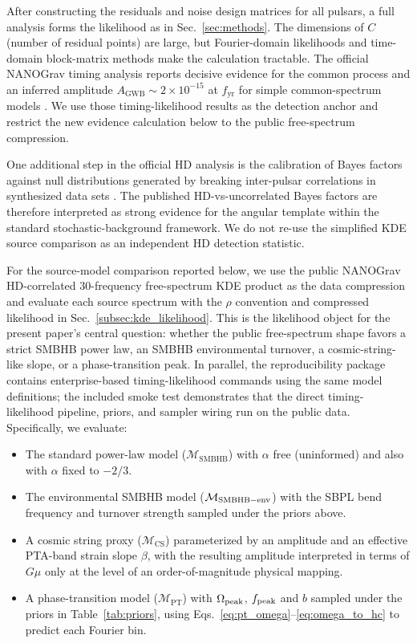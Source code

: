 \documentclass[symmetry,article,submit,pdftex,moreauthors]{Definitions/mdpi}
\begin{document}
After constructing the residuals and noise design matrices for all pulsars, a full analysis forms the likelihood as in Sec.~\ref{sec:methods}. The dimensions of $C$ (number of residual points) are large, but Fourier-domain likelihoods and time-domain block-matrix methods make the calculation tractable. The official NANOGrav timing analysis reports decisive evidence for the common process and an inferred amplitude $A_{\mathrm{GWB}}\sim2\times10^{-15}$ at $f_{\mathrm{yr}}$ for simple common-spectrum models \cite{NANOGrav15-Evidence}. We use those timing-likelihood results as the detection anchor and restrict the new evidence calculation below to the public free-spectrum compression.

One additional step in the official HD analysis is the calibration of Bayes factors against null distributions generated by breaking inter-pulsar correlations in synthesized data sets \cite{NANOGrav15-Evidence}. The published HD-vs-uncorrelated Bayes factors are therefore interpreted as strong evidence for the angular template within the standard stochastic-background framework. We do not re-use the simplified KDE source comparison as an independent HD detection statistic.

For the source-model comparison reported below, we use the public NANOGrav HD-correlated 30-frequency free-spectrum KDE product as the data compression and evaluate each source spectrum with the $\rho$ convention and compressed likelihood in Sec.~\ref{subsec:kde_likelihood}. This is the likelihood object for the present paper's central question: whether the public free-spectrum shape favors a strict SMBHB power law, an SMBHB environmental turnover, a cosmic-string-like slope, or a phase-transition peak. In parallel, the reproducibility package contains enterprise-based timing-likelihood commands using the same model definitions; the included smoke test demonstrates that the direct timing-likelihood pipeline, priors, and sampler wiring run on the public data. Specifically, we evaluate:
\begin{itemize}
    \item The standard power-law model ($\mathcal{M}_\mathrm{SMBHB}$) with $\alpha$ free (uninformed) and also with $\alpha$ fixed to $-2/3$.
    \item The environmental SMBHB model ($\mathcal{M}_{\rm SMBHB-env}$) with the SBPL bend frequency and turnover strength sampled under the priors above.
    \item A cosmic string proxy ($\mathcal{M}_\mathrm{CS}$) parameterized by an amplitude and an effective PTA-band strain slope $\beta$, with the resulting amplitude interpreted in terms of $G\mu$ only at the level of an order-of-magnitude physical mapping.
    \item A phase-transition model ($\mathcal{M}_\mathrm{PT}$) with $\Omega_{\rm peak}$, $f_{\rm peak}$ and $b$ sampled under the priors in Table~\ref{tab:priors}, using Eqs.~\eqref{eq:pt_omega}--\eqref{eq:omega_to_hc} to predict each Fourier bin.
\end{itemize}
\end{document}
